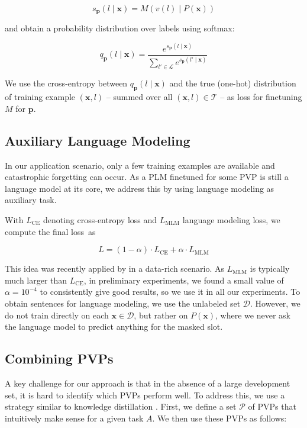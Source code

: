 \begin{equation*}
s_\mathbf{p}(l \mid \mathbf{x}) = M(v(l) \mid P(\textbf{x}))
\end{equation*}

and obtain a probability distribution over labels using softmax:

\begin{equation*}
q_\mathbf{p}(l \mid \mathbf{x}) =  \frac{e^{s_\mathbf{p}(l \mid \mathbf{x})}}{ \sum_{l' \in \mathcal{L}} e^{s_\mathbf{p}(l' \mid \mathbf{x})}} \label{eq-softmax}
\end{equation*}

We use the cross-entropy between $q_\mathbf{p}(l \mid
\mathbf{x})$ and the true (one-hot) distribution of training example $(\mathbf{x}, l)$ -- summed over all $(\mathbf{x},
l) \in \mathcal{T}$ -- as loss for finetuning $M$ for $\mathbf{p}$.

\subsection{Auxiliary Language Modeling} In our application scenario, only a few training examples are available and catastrophic forgetting can occur. As a PLM finetuned for some PVP is still a language model at its core, we address this by using language modeling as auxiliary task. 

With $L_\text{CE}$ denoting cross-entropy loss and $L_\text{MLM}$ language modeling loss, we compute the final loss~as

\begin{equation*}
L = (1 - \alpha) \cdot L_\text{CE} + \alpha \cdot L_\text{MLM}
\end{equation*}

This idea was recently applied by \citet{chronopoulou-etal-2019-embarrassingly} in a data-rich scenario. As $L_\text{MLM}$ is typically much larger than $L_\text{CE}$, in preliminary experiments, we found a small value of $\alpha = 10^{-4}$ to consistently give good results, so we use it in all our experiments. To obtain sentences for language modeling, we use the unlabeled set $\mathcal{D}$. However, we do not train directly on each $\mathbf{x} \in \mathcal{D}$, but rather on $P(\mathbf{x})$, where we never ask the language model to predict anything for the masked slot.
\subsection{Combining PVPs}

A key challenge for our approach is that in the absence of a large development set, it is hard to identify which PVPs perform well. To address this, we use a strategy similar to knowledge distillation \citep{hinton2015distilling}. First, we define a set $\mathcal{P}$ of PVPs that intuitively make sense for a given task $A$. We then use these PVPs as follows:

